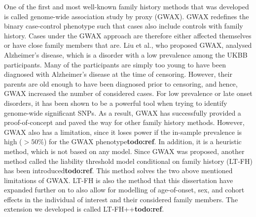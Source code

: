One of the first and most well-known family history methods that was developed is called genome-wide association study by proxy (GWAX)\cite{gwax}. GWAX redefines the binary case-control phenotype such that cases also include controls with family history. Cases under the GWAX approach are therefore either affected themselves or have close family members that are. Liu et al., who proposed GWAX, analysed Alzheimer's disease, which is a disorder with a low prevalence among the UKBB participants. Many of the participants are simply too young to have been diagnosed with Alzheimer's disease at the time of censoring. However, their parents are old enough to have been diagnosed prior to censoring, and hence, GWAX increased the number of considered cases. For low prevalence or late onset disorders, it has been shown to be a powerful tool when trying to identify genome-wide significant SNPs\cite{hujoel2020liability,gwax,pedersen2022accounting}. As a result, GWAX has successfully provided a proof-of-concept and paved the way for other family history methods. However, GWAX also has a limitation, since it loses power if the in-sample prevalence is high ($ >50\% $) for the GWAX phenotype\textbf{todo:ref}. In addition, it is a heuristic method, which is not based on any model. Since GWAX was proposed, another method called the liability threshold model conditional on family history (LT-FH) has been introduced\textbf{todo:ref}. This method solves the two above mentioned limitations of GWAX. LT-FH is also the method that this dissertation have expanded further on to also allow for modelling of age-of-onset, sex, and cohort effects in the individual of interest and their considered family members. The extension we developed is called LT-FH++\textbf{todo:ref}.

